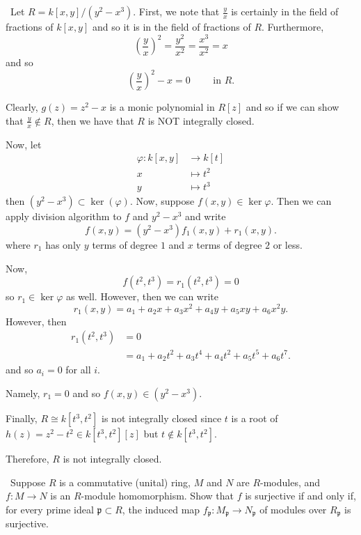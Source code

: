 \documentclass[12pt]{Qual}
\begin{document}
\begin{solution}$\,$
Let $R=k[x,y]/(y^2-x^3)$. First, we note that $\frac{y}{x}$ is certainly in the field of fractions of $k[x,y]$ and so it is in the field of fractions of $R$. Furthermore, $$\left(\frac{y}{x}\right)^2=\frac{y^2}{x^2}=\frac{x^3}{x^2}=x$$ and so $$\left(\frac{y}{x}\right)^2-x=0\qquad\text{ in }R.$$

Clearly, $g(z)=z^2-x$ is a monic polynomial in $R[z]$ and so if we can show that $\frac{y}{x}\notin R$, then we have that $R$ is NOT integrally closed.

Now, let \begin{align*}
    \varphi:k[x,y]&\to k[t]\\
    x&\mapsto t^2\\
    y&\mapsto t^3
\end{align*} then $(y^2-x^3)\subset \ker(\varphi)$. Now, suppose $f(x,y)\in\ker\varphi$. Then we can apply division algorithm to $f$ and $y^2-x^3$ and write $$f(x,y)=(y^2-x^3)f_1(x,y)+r_1(x,y).$$ where $r_1$ has only $y$ terms of degree $1$ and $x$ terms of degree $2$ or less.

Now, $$f(t^2,t^3)=r_1(t^2,t^3)=0$$ so $r_1\in\ker\varphi$ as well. However, then we can write $$r_1(x,y)=a_1+a_2x+a_3x^2+a_4y+a_5xy+a_6x^2y.$$ However, then \begin{align*}
    r_1(t^2,t^3)&=0\\
    &=a_1+a_2t^2+a_3t^4+a_4t^2+a_5t^5+a_6t^7.
\end{align*} and so $a_i=0$ for all $i$.

Namely, $r_1=0$ and so $f(x,y)\in(y^2-x^3).$

Finally, $R\cong k[t^3,t^2]$ is not integrally closed since $t$ is a root of $h(z)=z^2-t^2\in k[t^3,t^2][z]$ but $t\notin k[t^3,t^2]$.

Therefore, $R$ is not integrally closed.
\end{solution}
\newpage



\begin{problem} $\,$
Suppose $R$ is a commutative (unital) ring, $M$ and $N$ are $R$-modules, and $f:M\to N$ is an $R$-module homomorphism. Show that $f$ is surjective if and only if, for every prime ideal $\mathfrak{p}\subset R$, the induced map $f_\mathfrak{p}:M_\mathfrak{p}\to N_\mathfrak{p}$ of modules over $R_\mathfrak{p}$ is surjective.
\end{problem}
\end{document}
